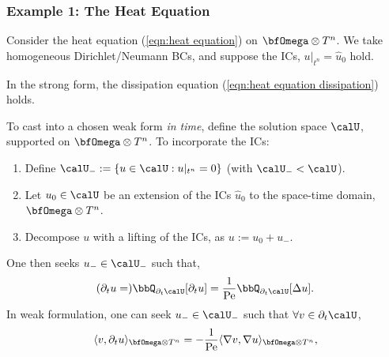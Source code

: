 \subsubsection{Example 1: The Heat Equation}
    \begin{example}
        Consider the heat equation (\ref{eqn:heat equation}) on $\bfOmega\otimes T^{n}$. We take homogeneous Dirichlet/Neumann BCs, and suppose the ICs, $u|_{t^{n}}  =  \widehat{u}_{0}$ hold.
        
        In the strong form, the dissipation equation (\ref{eqn:heat equation dissipation}) holds.

        To cast into a chosen weak form \emph{in time}, define the solution space $\calU$, supported on $\bfOmega\otimes T^{n}$. To incorporate the ICs:
        \begin{enumerate}
            \item  Define $\calU_{-}  :=  \{u  \in  \calU  :  u|_{t^{n}}  =  0\}$ (with $\calU_{-}  <  \calU$).
            \item  Let $u_{0}  \in  \calU$ be an extension of the ICs $\widehat{u}_{0}$ to the space-time domain, $\bfOmega\otimes T^{n}$.
            \item  Decompose $u$ with a lifting of the ICs, as $u  :=  u_{0} + u_{-}$.
        \end{enumerate}
        One then seeks $u_{-}  \in  \calU_{-}$ such that,
        \begin{equation}
            (\partial_{t}u  =)  \bbQ_{\partial_{t}\calU}[\partial_{t}u]  =  \frac{1}{\rmPe}\bbQ_{\partial_{t}\calU}[\Delta u].
        \end{equation}
        In weak formulation, one can seek $u_{-}  \in  \calU_{-}$ such that $\forall  v  \in  \partial_{t}\calU$,
        \begin{equation}\label{eqn:heat equation weak form}
            \langle v, \partial_{t}u\rangle_{\bfOmega\otimes T^{n}}  =   - \frac{1}{\rmPe}\langle\nabla v, \nabla u\rangle_{\bfOmega\otimes T^{n}},
        \end{equation}
        

\end{example}
